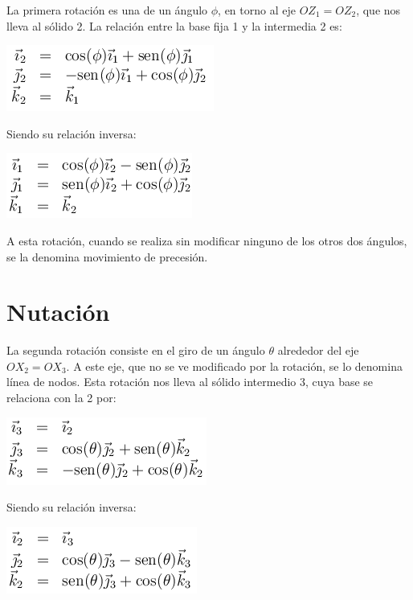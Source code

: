 \documentclass[11pt,a4paper,oldfontcommands,oneside]{memoir}
\begin{document}
La primera rotación es una de un ángulo $\phi$, en torno al eje $OZ_1 = OZ_2$, que nos lleva al sólido 2. La relación entre la base fija 1 y la intermedia 2 es:

\begin{center}
\includegraphics[scale=1.5]{1.png} 
\end{center}

Siendo su relación inversa:

\begin{center}
\includegraphics[scale=1.5]{2.png} 
\end{center}

A esta rotación, cuando se realiza sin modificar ninguno de los otros dos ángulos, se la denomina movimiento de precesión.

\section{Nutación}
La segunda rotación consiste en el giro de un ángulo $\theta$ alrededor del eje $OX_2 = OX_3$. A este eje, que no se ve modificado por la rotación, se lo denomina línea de nodos. Esta rotación nos lleva al sólido intermedio 3, cuya base se relaciona con la 2 por:

\begin{center}
\includegraphics[scale=1.5]{3.png} 
\end{center}

Siendo su relación inversa:

\begin{center}
\includegraphics[scale=1.5]{4.png} 
\end{center}
\end{document}
